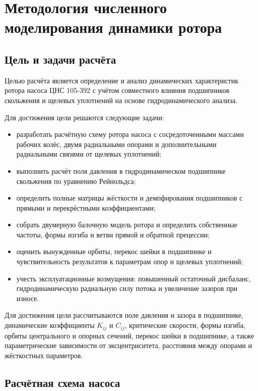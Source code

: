 \documentclass[14pt,a4paper]{extarticle}
\numberwithin{equation}{section}
\numberwithin{figure}{section}
\numberwithin{table}{section}
\begin{document}
\setcounter{section}{1}

\section{Методология численного моделирования динамики ротора}

\subsection{Цель и задачи расчёта}

Целью расчёта является определение и анализ динамических характеристик ротора насоса ЦНС 105-392 с учётом совместного влияния подшипников скольжения и щелевых уплотнений на основе гидродинамического анализа.

Для достижения цели решаются следующие задачи:
\begin{itemize}
    \item разработать расчётную схему ротора насоса с сосредоточенными массами рабочих колёс, двумя радиальными опорами и дополнительными радиальными связями от щелевых уплотнений;
    \item выполнить расчёт поля давления в гидродинамическом подшипнике скольжения по уравнению Рейнольдса;
    \item определить полные матрицы жёсткости и демпфирования подшипников с прямыми и перекрёстными коэффициентами;
    \item собрать двумерную балочную модель ротора и определить собственные частоты, формы изгиба и ветви прямой и обратной прецессии;
    \item оценить вынужденные орбиты, перекос шейки в подшипнике и чувствительность результатов к параметрам опор и щелевых уплотнений;
    \item учесть эксплуатационные возмущения: повышенный остаточный дисбаланс, гидродинамическую радиальную силу потока и увеличение зазоров при износе.
\end{itemize}

Для достижения цели рассчитываются поле давления и зазора в подшипнике, динамические коэффициенты $K_{ij}$ и $C_{ij}$, критические скорости, формы изгиба, орбиты центрального и опорных сечений, перекос шейки в подшипнике, а также параметрические зависимости от эксцентриситета, расстояния между опорами и жёсткостных параметров.

\subsection{Расчётная схема насоса}
\end{document}
